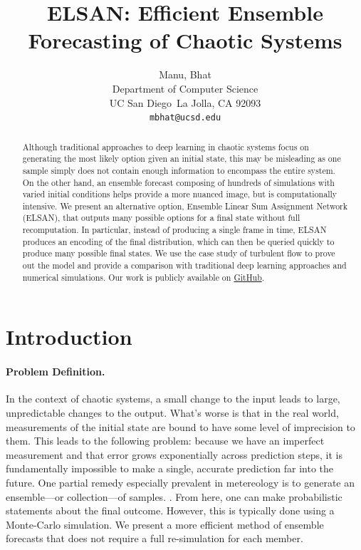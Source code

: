 \documentclass{article}
\title{ELSAN: Efficient Ensemble Forecasting of Chaotic Systems}
\author{%
  Manu, Bhat \\
  Department of Computer Science\\
  UC San Diego\
  La Jolla, CA 92093 \\
  \texttt{mbhat@ucsd.edu} \\
}
\begin{document}
\maketitle


\begin{abstract}
    Although traditional approaches to deep learning in chaotic systems focus on generating the most likely option given an initial state, this may be misleading as one sample simply does not contain enough information to encompass the entire system. On the other hand, an ensemble forecast composing of hundreds of simulations with varied initial conditions helps provide a more nuanced image, but is computationally intensive. We present an alternative option, Ensemble Linear Sum Assignment Network (ELSAN), that outputs many possible options for a final state without full recomputation. In particular, instead of producing a single frame in time, ELSAN produces an encoding of the final distribution, which can then be queried quickly to produce many possible final states. We use the case study of turbulent flow to prove out the model and provide a comparison with traditional deep learning approaches and numerical simulations. Our work is publicly available on \href{https://github.com/enigmurl/tf-net-confidence-domain}{GitHub}.
\end{abstract}

\section{Introduction}

\paragraph{Problem Definition.}

In the context of chaotic systems, a small change to the input leads to large, unpredictable changes to the output. What's worse is that in the real world, measurements of the initial state are bound to have some level of imprecision to them. This leads to the following problem: because we have an imperfect measurement and that error grows exponentially across prediction steps, it is fundamentally impossible to make a single, accurate prediction far into the future. One partial remedy especially prevalent in metereology is to generate an ensemble—or collection—of samples. \cite{TyphoonEnsemblePredictionSystemDevelopedattheJapanMeteorologicalAgency}. From here, one can make probabilistic statements about the final outcome. However, this is typically done using a Monte-Carlo simulation. We present a more efficient method of ensemble forecasts that does not require a full re-simulation for each member.
\end{document}
